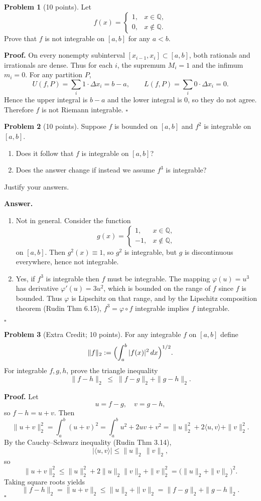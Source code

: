 \documentclass[12pt,oneside]{article}
\theoremstyle{definition}
\newtheorem{problem}{Problem}
\begin{document}
\begin{problem}[10 points]
Let
\[
f(x)=
\begin{cases}
1,&x\in\mathbb{Q},\\
0,&x\notin\mathbb{Q}.
\end{cases}
\]
Prove that $f$ is not integrable on $[a,b]$ for any $a<b$.
\end{problem}
\textbf{Proof.}
On every nonempty subinterval $[x_{i-1},x_i]\subset[a,b]$, both rationals and irrationals are dense.  Thus for each $i$, the supremum $M_i=1$ and the infimum $m_i=0$.  For any partition $P$, 
\[
U(f,P)=\sum_i 1\cdot\Delta x_i = b-a,
\qquad
L(f,P)=\sum_i 0\cdot\Delta x_i =0.
\]
Hence the upper integral is $b-a$ and the lower integral is $0$, so they do not agree.  Therefore $f$ is not Riemann integrable.
\hfill$\square$

\bigskip

\begin{problem}[10 points]
Suppose $f$ is bounded on $[a,b]$ and $f^2$ is integrable on $[a,b]$.
\begin{enumerate}
  \item Does it follow that $f$ is integrable on $[a,b]$?
  \item Does the answer change if instead we assume $f^3$ is integrable?
\end{enumerate}
Justify your answers.
\end{problem}
\textbf{Answer.}
\begin{enumerate}
\item Not in general.  Consider the function
\[
g(x)=
\begin{cases}
1,&x\in\mathbb{Q},\\
-1,&x\notin\mathbb{Q},
\end{cases}
\]
on $[a,b]$.  Then $g^2(x)\equiv1$, so $g^2$ is integrable, but $g$ is discontinuous everywhere, hence not integrable.

\item Yes, if $f^3$ is integrable then $f$ must be integrable.  The mapping $\varphi(u)=u^3$ has derivative $\varphi'(u)=3u^2$, which is bounded on the range of $f$ since $f$ is bounded.  Thus $\varphi$ is Lipschitz on that range, and by the Lipschitz composition theorem (Rudin Thm 6.15), $f^3=\varphi\circ f$ integrable implies $f$ integrable.
\end{enumerate}
\hfill$\square$

\bigskip

\begin{problem}[Extra Credit; 10 points]
For any integrable $f$ on $[a,b]$ define
\[
\|f\|_2 := \Bigl(\int_a^b |f(x)|^2\,dx\Bigr)^{1/2}.
\]
For integrable $f,g,h$, prove the triangle inequality
\[
\|f-h\|_2 \;\le\;\|f-g\|_2 + \|g-h\|_2.
\]
\end{problem}
\textbf{Proof.}
Let
\[
u = f-g,\quad v = g-h,
\]
so $f-h = u+v$.  Then
\[
\|u+v\|_2^2
= \int_a^b (u+v)^2
= \int_a^b u^2 + 2uv + v^2
= \|u\|_2^2 + 2\langle u,v\rangle + \|v\|_2^2.
\]
By the Cauchy–Schwarz inequality (Rudin Thm 3.14),
\[
|\langle u,v\rangle|
\le \|u\|_2\,\|v\|_2,
\]
so
\[
\|u+v\|_2^2
\le \|u\|_2^2 + 2\|u\|_2\|v\|_2 + \|v\|_2^2
= \bigl(\|u\|_2 + \|v\|_2\bigr)^2.
\]
Taking square roots yields
\[
\|f-h\|_2 = \|u+v\|_2 \le \|u\|_2 + \|v\|_2
= \|f-g\|_2 + \|g-h\|_2.
\]
\hfill$\square$
\end{document}
